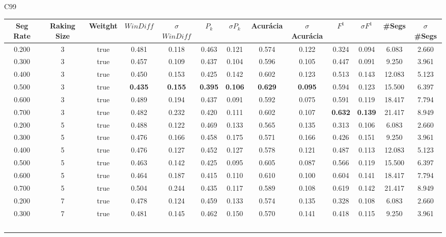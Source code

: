  \newpage
\center C99
\begin{longtable}[c]{|c|c|c|c|c|c|c|c|c|c|c|c|c|} 
\hline 
 Seg Rate & Raking Size & Weitght & $WinDiff$ & $\sigma$$WinDiff$ & $P_k$ & $\sigma$$P_k$ & Acurácia & $\sigma$Acurácia & $F^1$ & $\sigma$$F^1$ & \#Segs & $\sigma$\#Segs\\ \hline 
 0.200 & 3 & true & 0.481 & 0.118 & 0.463 & 0.121 & 0.574 & 0.122 & 0.324 & 0.094 & 6.083 & 2.660  \\ \hline 
  0.300 & 3 & true & 0.457 & 0.109 & 0.437 & 0.104 & 0.596 & 0.105 & 0.447 & 0.091 & 9.250 & 3.961  \\ \hline 
  0.400 & 3 & true & 0.450 & 0.153 & 0.425 & 0.142 & 0.602 & 0.123 & 0.513 & 0.143 & 12.083 & 5.123  \\ \hline 
  0.500 & 3 & true & \cellcolor{gray!20} \textbf{0.435} & \cellcolor{gray!20} \textbf{0.155} & \cellcolor{gray!20} \textbf{0.395} & \cellcolor{gray!20} \textbf{0.106} & \cellcolor{gray!20} \textbf{0.629} & \cellcolor{gray!20} \textbf{0.095} & 0.594 & 0.123 & 15.500 & 6.397  \\ \hline 
  0.600 & 3 & true & 0.489 & 0.194 & 0.437 & 0.091 & 0.592 & 0.075 & 0.591 & 0.119 & 18.417 & 7.794  \\ \hline 
  0.700 & 3 & true & 0.482 & 0.232 & 0.420 & 0.111 & 0.602 & 0.107 & \cellcolor{gray!20} \textbf{0.632} & \cellcolor{gray!20} \textbf{0.139} & 21.417 & 8.949  \\ \hline 
  0.200 & 5 & true & 0.488 & 0.122 & 0.469 & 0.133 & 0.565 & 0.135 & 0.313 & 0.106 & 6.083 & 2.660  \\ \hline 
  0.300 & 5 & true & 0.476 & 0.166 & 0.458 & 0.175 & 0.571 & 0.166 & 0.426 & 0.151 & 9.250 & 3.961  \\ \hline 
  0.400 & 5 & true & 0.476 & 0.127 & 0.452 & 0.127 & 0.578 & 0.121 & 0.487 & 0.113 & 12.083 & 5.123  \\ \hline 
  0.500 & 5 & true & 0.463 & 0.142 & 0.425 & 0.095 & 0.605 & 0.087 & 0.566 & 0.119 & 15.500 & 6.397  \\ \hline 
  0.600 & 5 & true & 0.464 & 0.187 & 0.415 & 0.110 & 0.610 & 0.100 & 0.604 & 0.141 & 18.417 & 7.794  \\ \hline 
  0.700 & 5 & true & 0.504 & 0.244 & 0.435 & 0.117 & 0.589 & 0.108 & 0.619 & 0.142 & 21.417 & 8.949  \\ \hline 
  0.200 & 7 & true & 0.478 & 0.124 & 0.459 & 0.133 & 0.574 & 0.135 & 0.328 & 0.108 & 6.083 & 2.660  \\ \hline 
  0.300 & 7 & true & 0.481 & 0.145 & 0.462 & 0.150 & 0.570 & 0.141 & 0.418 & 0.115 & 9.250 & 3.961  \\ \hline 
$$
\end{longtable}
